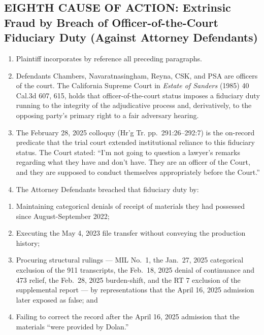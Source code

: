 \subsection{EIGHTH CAUSE OF ACTION: Extrinsic Fraud by Breach of Officer-of-the-Court Fiduciary Duty (Against Attorney Defendants)}\label{eighth-cause-of-action-extrinsic-fraud-by-breach-of-officer-of-the-court-fiduciary-duty-against-attorney-defendants}

\begin{enumerate}
\def\labelenumi{\arabic{enumi}.}
\setcounter{enumi}{80}
\item
  Plaintiff incorporates by reference all preceding paragraphs.
\item
  Defendants Chambers, Navaratnasingham, Reyna, CSK, and PSA are officers of the court. The California Supreme Court in \emph{Estate of Sanders} (1985) 40 Cal.3d 607, 615, holds that officer-of-the-court status imposes a fiduciary duty running to the integrity of the adjudicative process and, derivatively, to the opposing party's primary right to a fair adversary hearing.
\item
  The February 28, 2025 colloquy (Hr'g Tr. pp.~291:26--292:7) is the on-record predicate that the trial court extended institutional reliance to this fiduciary status. The Court stated: ``I'm not going to question a lawyer's remarks regarding what they have and don't have. They are an officer of the Court, and they are supposed to conduct themselves appropriately before the Court.''
\item
  The Attorney Defendants breached that fiduciary duty by:
\end{enumerate}

\begin{enumerate}
\def\labelenumi{(\alph{enumi})}
\item
  Maintaining categorical denials of receipt of materials they had possessed since August-September 2022;
\item
  Executing the May 4, 2023 file transfer without conveying the production history;
\item
  Procuring structural rulings --- MIL No.~1, the Jan.~27, 2025 categorical exclusion of the 911 transcripts, the Feb.~18, 2025 denial of continuance and \textsection{} 473 relief, the Feb.~28, 2025 burden-shift, and the RT 7 exclusion of the supplemental report --- by representations that the April 16, 2025 admission later exposed as false; and
\item
  Failing to correct the record after the April 16, 2025 admission that the materials ``were provided by Dolan.''
\end{enumerate}

